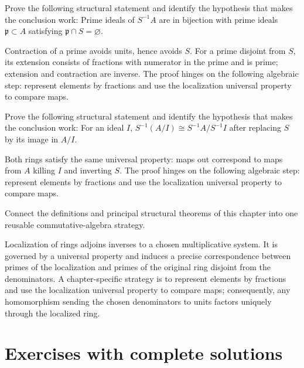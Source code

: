 \begin{problem}\label{prob:v06-problem-10}
Prove the following structural statement and identify the hypothesis that makes the conclusion work: Prime ideals of $S^{-1}A$ are in bijection with prime ideals $\mathfrak p\subset A$ satisfying $\mathfrak p\cap S=\varnothing$.
\end{problem}
\begin{solution}
Contraction of a prime avoids units, hence avoids $S$. For a prime disjoint from $S$, its extension consists of fractions with numerator in the prime and is prime; extension and contraction are inverse. The proof hinges on the following algebraic step: represent elements by fractions and use the localization universal property to compare maps.
\end{solution}

\begin{problem}\label{prob:v06-problem-11}
Prove the following structural statement and identify the hypothesis that makes the conclusion work: For an ideal $I$, $S^{-1}(A/I)\cong S^{-1}A/S^{-1}I$ after replacing $S$ by its image in $A/I$.
\end{problem}
\begin{solution}
Both rings satisfy the same universal property: maps out correspond to maps from $A$ killing $I$ and inverting $S$. The proof hinges on the following algebraic step: represent elements by fractions and use the localization universal property to compare maps.
\end{solution}

\begin{problem}\label{prob:v06-problem-12}
Connect the definitions and principal structural theorems of this chapter into one reusable commutative-algebra strategy.
\end{problem}
\begin{solution}
Localization of rings adjoins inverses to a chosen multiplicative system. It is governed by a universal property and induces a precise correspondence between primes of the localization and primes of the original ring disjoint from the denominators. A chapter-specific strategy is to represent elements by fractions and use the localization universal property to compare maps; consequently, any homomorphism sending the chosen denominators to units factors uniquely through the localized ring.
\end{solution}

\section{Exercises with complete solutions}

